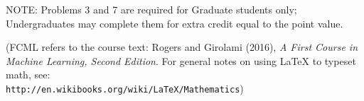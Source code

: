 \documentclass[10pt]{article}
\newcommand{\latex}{\LaTeX\xspace}
\begin{document}

NOTE: Problems 3 and 7 are required for Graduate students only; Undergraduates may complete them for extra credit equal to the point value.

(FCML refers to the course text: Rogers and Girolami (2016), {\em A First Course in Machine Learning, Second Edition}.  For general notes on using \latex to typeset math, see:\\ {\tt http://en.wikibooks.org/wiki/LaTeX/Mathematics})
\vspace{.5cm}

\end{document}
